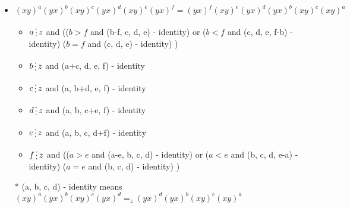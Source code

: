 \documentclass[utf8]{article}
\newcommand{\divisibleby}{\mathop{\raisebox{-2pt}{\vdots}}}
\begin{document}
	\begin{itemize}		
		\item $(xy)^a(yx)^b(xy)^c(yx)^d(xy)^e(yx)^f = (yx)^f(xy)^e(yx)^d(yx)^b(xy)^c(xy)^a$
		\begin{itemize}
			\item $a \divisibleby z$ and (($b > f$ and (b-f, c, d, e) - identity) or ($b < f$ and (c, d, e, f-b) - identity) ($b = f$ and (c, d, e) - identity) )
			\item  $b \divisibleby z$ and (a+c, d, e, f) - identity
			\item $c \divisibleby z$ and (a, b+d, e, f) - identity
			\item $d \divisibleby z$ and (a, b, c+e, f) - identity
			\item $e \divisibleby z$ and (a, b, c, d+f) - identity
			\item $f \divisibleby z$ and (($a > e$ and (a-e, b, c, d) - identity) or ($a < e$ and (b, c, d, e-a) - identity) ($a = e$ and (b, c, d) - identity) )
		\end{itemize}
		\item[*] (a, b, c, d) - identity means $(xy)^a(yx)^b(xy)^c(yx)^d =_z (yx)^d(yx)^b(xy)^c(xy)^a$
	\end{itemize}
\end{document}
